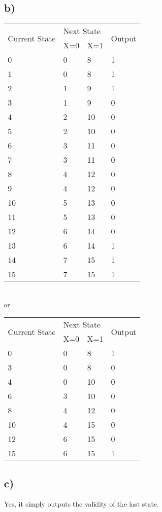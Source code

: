 \documentclass{article}
\begin{document}
\subsection{b)}
\begin{tabular}{l | l | l | l}
\multirow{2}{*}{Current State} & \multicolumn{2}{|l|}{Next State} & \multirow{2}{*}{Output} \\
                               & X=0            & X=1           &                         \\
\hline
0  & 0  & 8  & 1 \\
1  & 0  & 8  & 1 \\
2  & 1  & 9  & 1 \\
3  & 1  & 9  & 0 \\
4  & 2  & 10 & 0 \\
5  & 2  & 10 & 0 \\
6  & 3  & 11 & 0 \\
7  & 3  & 11 & 0 \\
8  & 4  & 12 & 0 \\
9  & 4  & 12 & 0 \\
10 & 5  & 13 & 0 \\
11 & 5  & 13 & 0 \\
12 & 6  & 14 & 0 \\
13 & 6  & 14 & 1 \\
14 & 7  & 15 & 1 \\
15 & 7  & 15 & 1 
\end{tabular} \\
or\\
\begin{tabular}{l | l | l | l}
\multirow{2}{*}{Current State} & \multicolumn{2}{|l|}{Next State} & \multirow{2}{*}{Output} \\
                               & X=0            & X=1           &                         \\
\hline
0  & 0  & 8  & 1 \\
3  & 0  & 8  & 0 \\
4  & 0  & 10 & 0 \\
6  & 3  & 10 & 0 \\
8  & 4  & 12 & 0 \\
10 & 4  & 15 & 0 \\
12 & 6  & 15 & 0 \\
15 & 6  & 15 & 1 
\end{tabular}

\subsection{c)}
Yes, it simply outputs the validity of the last state.
\end{document}
